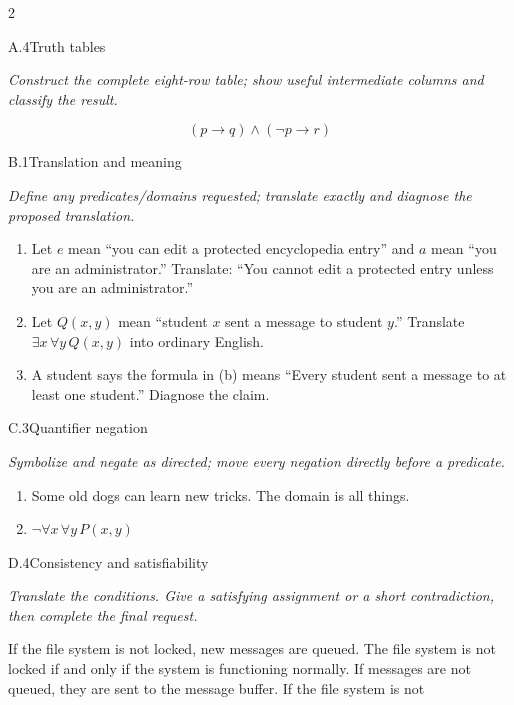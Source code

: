 \documentclass[9pt]{extarticle}
\begin{document}
\begin{multicols}{2}
\begin{CoreProblem}{A.4}{Truth tables}
{\scriptsize\textit{Construct the complete eight-row table; show useful intermediate columns and classify the result.}\par}
\[
  (p\to q)\land(\neg p\to r)
\]
\end{CoreProblem}
\begin{CoreProblem}{B.1}{Translation and meaning}
{\scriptsize\textit{Define any predicates/domains requested; translate exactly and diagnose the proposed translation.}\par}
\begin{enumerate}[label=(\alph*)]
  \item Let $e$ mean ``you can edit a protected encyclopedia entry'' and $a$
        mean ``you are an administrator.'' Translate: ``You cannot edit a
        protected entry unless you are an administrator.''
  \item Let $Q(x,y)$ mean ``student $x$ sent a message to student $y$.''
        Translate $\exists x\,\forall y\,Q(x,y)$ into ordinary English.
  \item A student says the formula in (b) means ``Every student sent a message
        to at least one student.'' Diagnose the claim.
\end{enumerate}
\end{CoreProblem}
\begin{CoreProblem}{C.3}{Quantifier negation}
{\scriptsize\textit{Symbolize and negate as directed; move every negation directly before a predicate.}\par}
\begin{enumerate}[label=(\alph*)]
  \item Some old dogs can learn new tricks. The domain is all things.
  \item $\neg\forall x\,\forall y\,P(x,y)$
\end{enumerate}
\end{CoreProblem}
\columnbreak
\begin{CoreProblem}{D.4}{Consistency and satisfiability}
{\scriptsize\textit{Translate the conditions. Give a satisfying assignment or a short contradiction, then complete the final request.}\par}
If the file system is not locked, new messages are queued. The file system is
not locked if and only if the system is functioning normally. If messages are
not queued, they are sent to the message buffer. If the file system is not

\end{CoreProblem}
\end{multicols}
\end{document}
